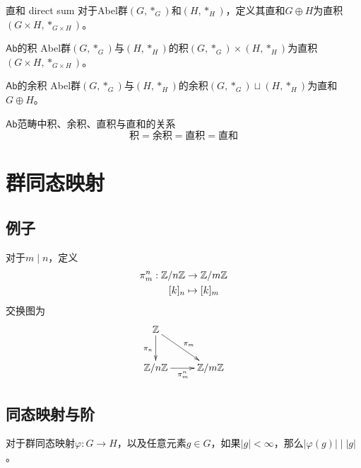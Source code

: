 \begin{definition}{直和 direct sum}
	对于Abel群$(G,*_G)$和$(H,*_H)$，定义其直和$G\oplus H$为直积$(G\times H,*_{G\times H})$。
\end{definition}

\begin{definition}{$\mathsf{Ab}$的积}
	Abel群$(G,*_G)$与$(H,*_H)$的积$(G,*_G)\times (H,*_H)$为直积$(G\times H,*_{G\times H})$。
\end{definition}

\begin{definition}{$\mathsf{Ab}$的余积}
	Abel群$(G,*_G)$与$(H,*_H)$的余积$(G,*_G)\sqcup (H,*_H)$为直和$G\oplus H$。
\end{definition}

\begin{proposition}{$\mathsf{Ab}$范畴中积、余积、直积与直和的关系}
	$$
	\text{积}=\text{余积}=\text{直积}=\text{直和}
	$$
\end{proposition}

\section{群同态映射}

\subsection{例子}

\begin{example}
	对于$m\mid n$，定义
	\begin{align*}
		\pi_m^n:\begin{aligned}[t]
			\mathbb{Z}/n\mathbb{Z}&\to \mathbb{Z}/m\mathbb{Z}\\
			[k]_n&\mapsto [k]_m
		\end{aligned}
	\end{align*}
	交换图为
	$$
	\xymatrix{
		\Z \ar[d]_{\pi_n} \ar[rd]^{\pi_m}\\
		\Z/n\Z \ar[r]_{\pi_m^n} & \Z/m\Z
	}
	$$
\end{example}

\subsection{同态映射与阶}

\begin{proposition}
	对于群同态映射$\varphi:G\to H$，以及任意元素$g\in G$，如果$|g|<\infty$，那么$|\varphi(g)|\mid |g|$。
\end{proposition}

